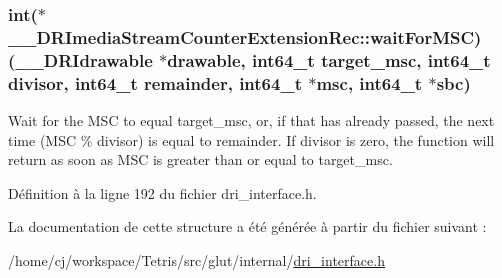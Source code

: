 \hypertarget{struct_____d_r_imedia_stream_counter_extension_rec_aeda6d64b0682f087ddbac0b328678824}{
\subsubsection[{wait\-For\-M\-S\-C}]{\setlength{\rightskip}{0pt plus 5cm}int($\ast$ \-\_\-\-\_\-\-D\-R\-Imedia\-Stream\-Counter\-Extension\-Rec\-::wait\-For\-M\-S\-C)({\bf \-\_\-\-\_\-\-D\-R\-Idrawable} $\ast$drawable, int64\-\_\-t target\-\_\-msc, int64\-\_\-t {\bf divisor}, int64\-\_\-t remainder, int64\-\_\-t $\ast$msc, int64\-\_\-t $\ast$sbc)}}\label{struct_____d_r_imedia_stream_counter_extension_rec_aeda6d64b0682f087ddbac0b328678824}
Wait for the M\-S\-C to equal target\-\_\-msc, or, if that has already passed, the next time (M\-S\-C \% divisor) is equal to remainder. If divisor is zero, the function will return as soon as M\-S\-C is greater than or equal to target\-\_\-msc. 

Définition à la ligne 192 du fichier dri\-\_\-interface.\-h.



La documentation de cette structure a été générée à partir du fichier suivant \-:\begin{DoxyCompactItemize}
\item 
/home/cj/workspace/\-Tetris/src/glut/internal/\hyperlink{dri__interface_8h}{dri\-\_\-interface.\-h}\end{DoxyCompactItemize}

